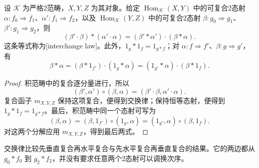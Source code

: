 \begin{proposition}\label{b4:prop:F-interchange-law}
	设 \(\mathcal K\) 为严格2范畴，\(X,Y,Z\) 为其对象。给定 \(\operatorname{Hom}_{\mathcal K}(X,Y)\) 中的可复合2态射 \(\alpha:f_0\Rightarrow f_1\)、\(\alpha':f_1\Rightarrow f_2\)，以及 \(\operatorname{Hom}_{\mathcal K}(Y,Z)\) 中的可复合2态射 \(\beta:g_0\Rightarrow g_1\)、\(\beta':g_1\Rightarrow g_2\)，则
	\[
		(\beta'\cdot\beta)*(\alpha'\cdot\alpha) =(\beta'*\alpha')\cdot(\beta*\alpha).
	\]
	这条等式称为[interchange law]。此外，\(1_g*1_f=1_{g*f}\)；对 \(\alpha:f\Rightarrow f'\)、\(\beta:g\Rightarrow g'\)，有
	\[
		\beta*\alpha =(\beta*1_{f'})\cdot(1_g*\alpha) =(1_{g'}*\alpha)\cdot(\beta*1_f).
	\]
\end{proposition}
\begin{proof}
	积范畴中的复合逐分量进行，所以
	\[
		(\beta',\alpha')\circ(\beta,\alpha) =(\beta'\cdot\beta,\alpha'\cdot\alpha).
	\]
	复合函子 \(m_{X,Y,Z}\) 保持这项复合，便得到交换律；保持恒等态射，便得到 \(1_g*1_f=1_{g*f}\)。最后，积范畴中同一个态射可写为
	\[
		(\beta,\alpha) =(\beta,1_{f'})\circ(1_g,\alpha) =(1_{g'},\alpha)\circ(\beta,1_f).
	\]
	对这两个分解应用 \(m_{X,Y,Z}\)，得到最后两式。
\end{proof}

交换律比较先垂直复合再水平复合与先水平复合再垂直复合的结果。它的两边都从 \(g_0*f_0\) 到 \(g_2*f_2\)，并没有要求任意两个2态射可以调换次序。

